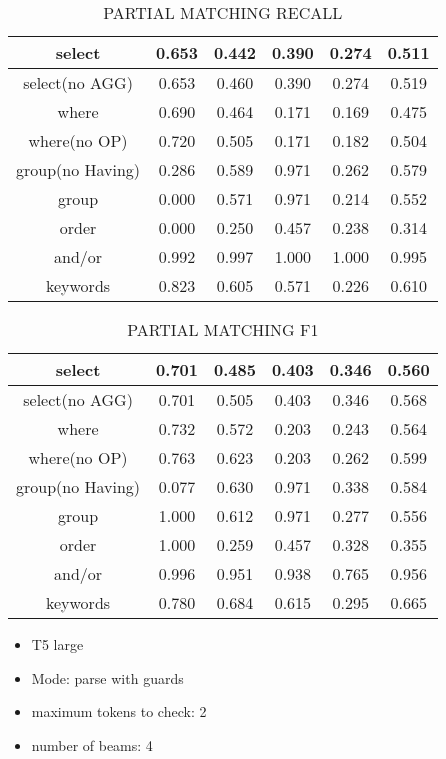 \begin{table}[h!]
    \centering
    \begin{tabular}{|c|c|c|c|c|c|}
        \hline
        select           & 0.653 & 0.442 & 0.390 & 0.274 & 0.511 \\ \hline
        select(no AGG)   & 0.653 & 0.460 & 0.390 & 0.274 & 0.519 \\ \hline
        where            & 0.690 & 0.464 & 0.171 & 0.169 & 0.475 \\ \hline
        where(no OP)     & 0.720 & 0.505 & 0.171 & 0.182 & 0.504 \\ \hline
        group(no Having) & 0.286 & 0.589 & 0.971 & 0.262 & 0.579 \\ \hline
        group            & 0.000 & 0.571 & 0.971 & 0.214 & 0.552 \\ \hline
        order            & 0.000 & 0.250 & 0.457 & 0.238 & 0.314 \\ \hline
        and/or           & 0.992 & 0.997 & 1.000 & 1.000 & 0.995 \\ \hline

        keywords         & 0.823 & 0.605 & 0.571 & 0.226 & 0.610 \\ \hline
    \end{tabular}
    \caption{PARTIAL MATCHING RECALL }

\end{table}
\begin{table}[h!]
    \centering
    \begin{tabular}{|c|c|c|c|c|c|}
        \hline
        select           & 0.701 & 0.485 & 0.403 & 0.346 & 0.560 \\ \hline
        select(no AGG)   & 0.701 & 0.505 & 0.403 & 0.346 & 0.568 \\ \hline
        where            & 0.732 & 0.572 & 0.203 & 0.243 & 0.564 \\ \hline
        where(no OP)     & 0.763 & 0.623 & 0.203 & 0.262 & 0.599 \\ \hline
        group(no Having) & 0.077 & 0.630 & 0.971 & 0.338 & 0.584 \\ \hline
        group            & 1.000 & 0.612 & 0.971 & 0.277 & 0.556 \\ \hline
        order            & 1.000 & 0.259 & 0.457 & 0.328 & 0.355 \\ \hline
        and/or           & 0.996 & 0.951 & 0.938 & 0.765 & 0.956 \\ \hline

        keywords         & 0.780 & 0.684 & 0.615 & 0.295 & 0.665 \\ \hline
    \end{tabular}
    \caption{PARTIAL MATCHING F1 }

\end{table}
\pagebreak
\begin{itemize}
    \item T5 large
    \item Mode: parse with guards
    \item maximum tokens to check: 2
    \item number of beams: 4
\end{itemize}

